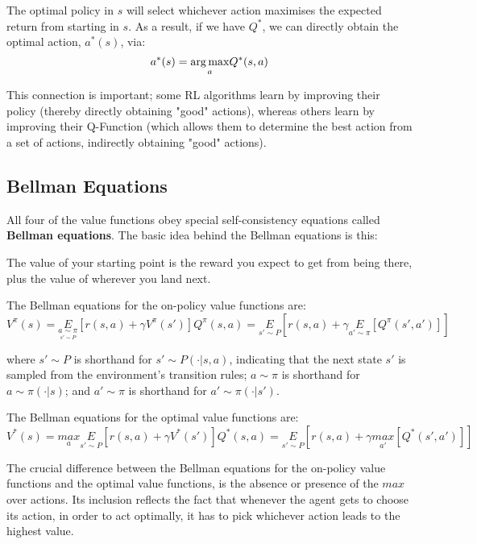 The optimal policy in $s$ will select whichever action maximises the expected return from starting in $s$. As a result, if we have $Q^{*}$, we can directly obtain the optimal action, $a^{*}(s)$, via:
\begin{equation}
	a^{*}(s) = \underset{a}{\operatorname*{arg\,max}} Q^{*}(s, a)
\end{equation}

This connection is important; some RL algorithms learn by improving their policy (thereby directly obtaining "good" actions), whereas others learn by improving their Q-Function (which allows them to determine the best action from a set of actions, indirectly obtaining "good" actions).

\subsection{Bellman Equations}
All four of the value functions obey special self-consistency equations called \textbf{Bellman equations}. The basic idea behind the Bellman equations is this:
\begin{center}
The value of your starting point is the reward you expect to get from being there, plus the value of wherever you land next.
\end{center}

The Bellman equations for the on-policy value functions are:
\begin{equation}
	V^{\pi}(s) = \underset{\underset{s' \sim P}{a \sim \pi}}{E} [r(s, a) + \gamma V^{\pi}(s')]
	Q^{\pi}(s, a) = \underset{s' \sim P}{E} [r(s, a) + \gamma \underset{a' \sim \pi}{E}[Q^{\pi}(s', a')]]
\end{equation}

where $s' \sim P$ is shorthand for $s' \sim P(\cdot|s, a)$, indicating that the next state $s'$ is sampled from the environment's transition rules; $a \sim \pi$ is shorthand for $a \sim \pi(\cdot|s)$; and $a' \sim \pi$ is shorthand for $a' \sim \pi(\cdot|s')$.

The Bellman equations for the optimal value functions are:
\begin{equation}
	V^{*}(s) = \underset{a}{max} \underset{s' \sim P}{E} [r(s, a) + \gamma V^{*}(s')]
	Q^{*}(s, a) = \underset{s' \sim P}{E} [r(s, a) + \gamma \underset{a'}{max}[Q^{*}(s', a')]]
\end{equation}

The crucial difference between the Bellman equations for the on-policy value functions and the optimal value functions, is the absence or presence of the $max$ over actions. Its inclusion reflects the fact that whenever the agent gets to choose its action, in order to act optimally, it has to pick whichever action leads to the highest value.

